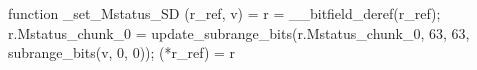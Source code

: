 function _set_Mstatus_SD (r_ref, v) = {
    r = __bitfield_deref(r_ref);
    r.Mstatus_chunk_0 = update_subrange_bits(r.Mstatus_chunk_0, 63, 63, subrange_bits(v, 0, 0));
    (*r_ref) = r
}
